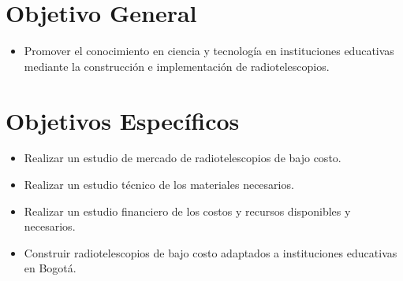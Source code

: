 \section{Objetivo General}
\begin{itemize}
  \item Promover el conocimiento en ciencia y tecnología en instituciones
    educativas mediante la construcción e implementación de radiotelescopios.
\end{itemize}

\section{Objetivos Específicos}
\begin{itemize}
  \item Realizar un estudio de mercado de radiotelescopios de bajo costo.
  \item Realizar un estudio técnico de los materiales necesarios.
  \item Realizar un estudio financiero de los costos y recursos disponibles y
    necesarios.
  \item Construir radiotelescopios de bajo costo adaptados a instituciones
    educativas en Bogotá.
\end{itemize}
